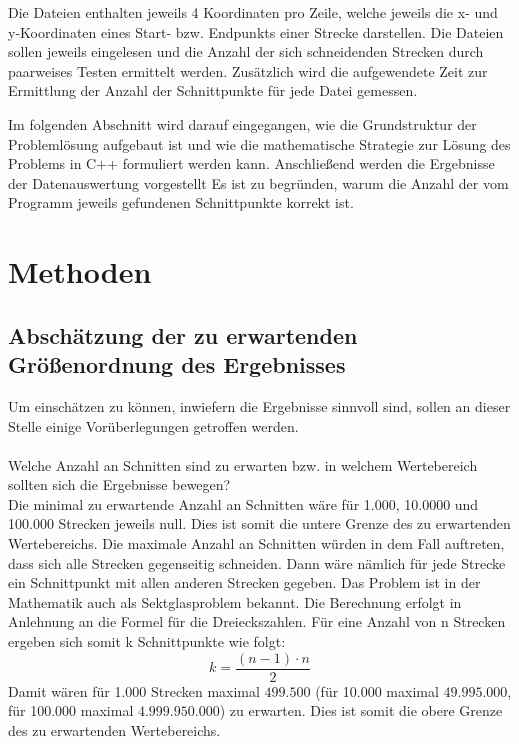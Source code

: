 \documentclass[12pt]{scrartcl}
\begin{document}
Die Dateien enthalten jeweils 4 Koordinaten pro Zeile, welche jeweils die x- und y-Koordinaten eines Start- bzw. Endpunkts einer Strecke darstellen.
Die Dateien sollen jeweils eingelesen und die Anzahl der sich schneidenden Strecken durch paarweises Testen ermittelt werden.
Zusätzlich wird die aufgewendete Zeit zur Ermittlung der Anzahl der Schnittpunkte für jede Datei gemessen.

Im folgenden Abschnitt wird darauf eingegangen, wie die Grundstruktur der Problemlösung aufgebaut ist und wie die mathematische Strategie zur Lösung des Problems in C++ formuliert werden kann.
Anschließend werden die Ergebnisse der Datenauswertung vorgestellt
Es ist zu begründen, warum die Anzahl der vom Programm jeweils gefundenen Schnittpunkte korrekt ist.

\section{Methoden}

\subsection{Abschätzung der zu erwartenden Größenordnung des Ergebnisses}

Um einschätzen zu können, inwiefern die Ergebnisse sinnvoll sind, sollen an dieser Stelle einige Vorüberlegungen getroffen werden.\\~\\
Welche Anzahl an Schnitten sind zu erwarten bzw. in welchem Wertebereich sollten sich die Ergebnisse bewegen?\\
Die minimal zu erwartende Anzahl an Schnitten wäre für 1.000, 10.0000 und 100.000 Strecken jeweils null.
Dies ist somit die untere Grenze des zu erwartenden Wertebereichs.
Die maximale Anzahl an Schnitten würden in dem Fall auftreten, dass sich alle Strecken gegenseitig schneiden.
Dann wäre nämlich für jede Strecke ein Schnittpunkt mit allen anderen Strecken gegeben.
Das Problem ist in der Mathematik auch als Sektglasproblem bekannt.
Die Berechnung erfolgt in Anlehnung an die Formel für die Dreieckszahlen.
Für eine Anzahl von n Strecken ergeben sich somit k Schnittpunkte wie folgt:
\begin{equation}
k = \frac{(n-1) \cdot n}{2}
\end{equation}
Damit wären für 1.000 Strecken maximal $499.500$ (für 10.000 maximal $49.995.000$,
für 100.000 maximal $4.999.950.000$) zu erwarten.
Dies ist somit die obere Grenze des zu erwartenden Wertebereichs.
\end{document}

